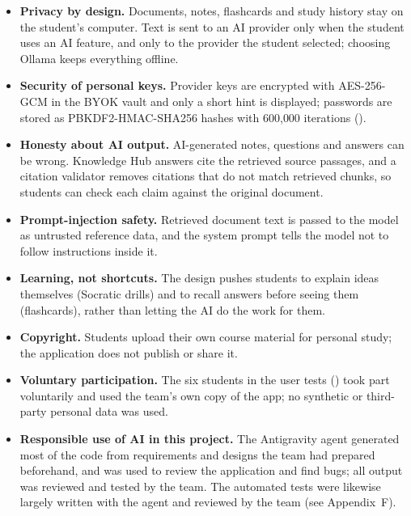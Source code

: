 \begin{itemize}
  \item \textbf{Privacy by design.} Documents, notes, flashcards and study history stay on the student's
  computer. Text is sent to an AI provider only when the student uses an AI feature, and only to the
  provider the student selected; choosing Ollama keeps everything offline.
  \item \textbf{Security of personal keys.} Provider keys are encrypted with AES-256-GCM in the BYOK
  vault and only a short hint is displayed; passwords are stored as PBKDF2-HMAC-SHA256 hashes with
  600{,}000 iterations ().
  \item \textbf{Honesty about AI output.} AI-generated notes, questions and answers can be wrong.
  Knowledge Hub answers cite the retrieved source passages, and a citation validator removes citations
  that do not match retrieved chunks, so students can check each claim against the original document.
  \item \textbf{Prompt-injection safety.} Retrieved document text is passed to the model as untrusted
  reference data, and the system prompt tells the model not to follow instructions inside it.
  \item \textbf{Learning, not shortcuts.} The design pushes students to explain ideas themselves
  (Socratic drills) and to recall answers before seeing them (flashcards), rather than letting the AI do
  the work for them.
  \item \textbf{Copyright.} Students upload their own course material for personal study; the application
  does not publish or share it.
  \item \textbf{Voluntary participation.} The six students in the user tests () took part
  voluntarily and used the team's own copy of the app; no synthetic or third-party personal data was
  used.
  \item \textbf{Responsible use of AI in this project.} The Antigravity agent generated most of the code
  from requirements and designs the team had prepared beforehand, and was used to review the application
  and find bugs; all output was reviewed and tested by the team. The automated tests were likewise largely
  written with the agent and reviewed by the team (see Appendix~F).
\end{itemize}
